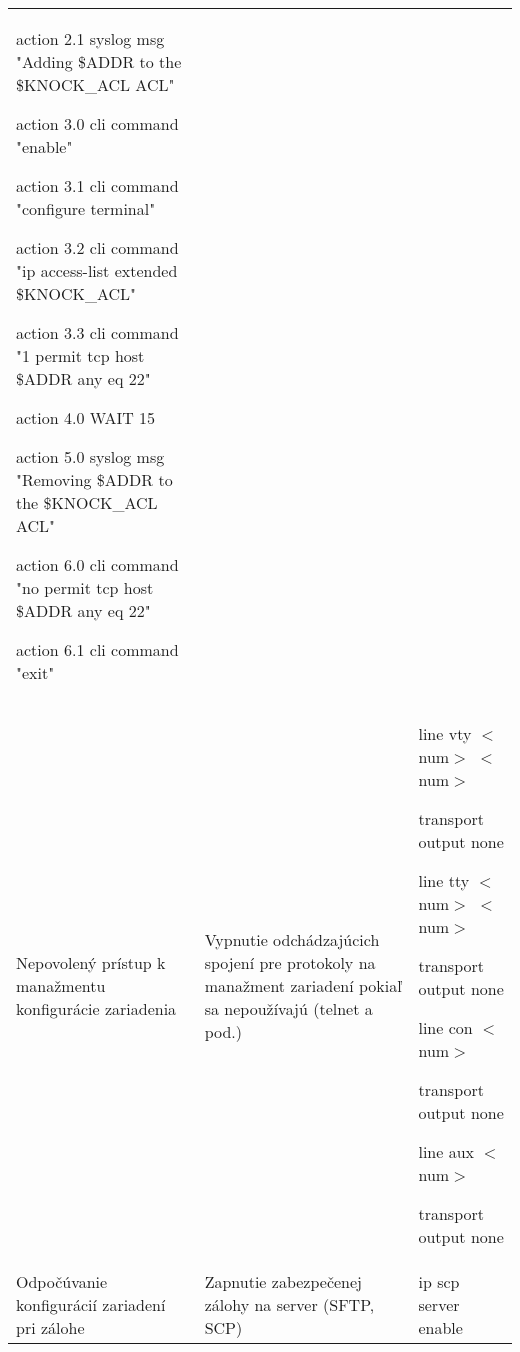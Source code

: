 \begin{longtable}[!htbp]{|L{10em}L{10em}>{\selectfont}L{34em}|}
	\hspace{0.5em}action 2.1 syslog msg "Adding \$ADDR to the \$KNOCK\_ACL ACL"
	
	\hspace{0.5em}action 3.0 cli command "enable"
	
	\hspace{0.5em}action 3.1 cli command "configure terminal"
	
	\hspace{0.5em}action 3.2 cli command "ip access-list extended \$KNOCK\_ACL"
	
	\hspace{0.5em}action 3.3 cli command "1 permit tcp host \$ADDR any eq 22"
	
	\hspace{0.5em}action 4.0 WAIT 15
	
	\hspace{0.5em}action 5.0 syslog msg "Removing \$ADDR to the \$KNOCK\_ACL ACL"
	
	\hspace{0.5em}action 6.0 cli command "no permit tcp host \$ADDR any eq 22"
	
	\hspace{0.5em}action 6.1 cli command "exit"\\
	
	
	
	Nepovolený prístup k manažmentu konfigurácie zariadenia	&Vypnutie odchádzajúcich spojení pre protokoly na manažment zariadení pokiaľ sa nepoužívajú (telnet a pod.)	&line vty $<$num$>$ $<$num$>$
	
	\hspace{0.5em}transport output none
	
	line tty $<$num$>$ $<$num$>$
	
	\hspace{0.5em}transport output none
	
	line con $<$num$>$
	
	\hspace{0.5em}transport output none
	
	line aux $<$num$>$
	
	\hspace{0.5em}transport output none\\
	
	
	
	
	
	Odpočúvanie konfigurácií zariadení pri zálohe	&Zapnutie zabezpečenej zálohy na server (SFTP, SCP)	&ip scp server enable
	

\end{longtable}
